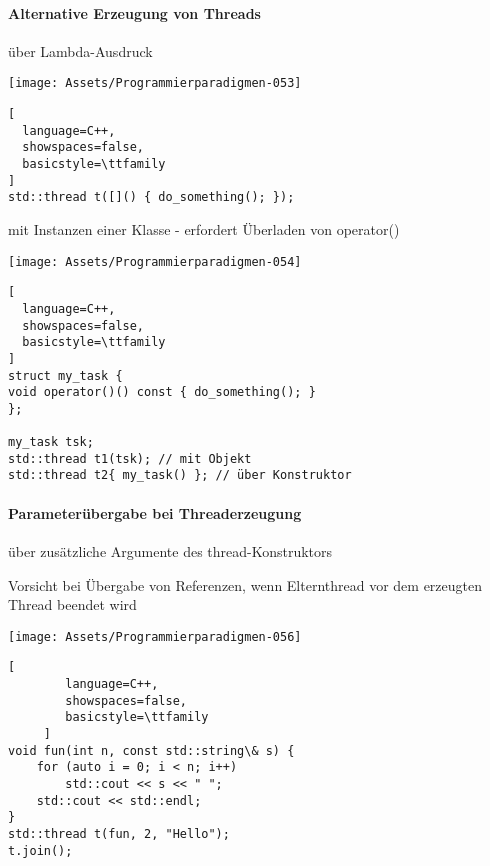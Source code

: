 \documentclass[10pt]{article}
\begin{document}
\paragraph{Alternative Erzeugung von Threads}
\color{orange} über Lambda-Ausdruck \color{black}
\begin{center}
  \texttt{[image: Assets/Programmierparadigmen-053]}
\end{center}\begin{lstlisting}[
  language=C++,
  showspaces=false,
  basicstyle=\ttfamily
]
std::thread t([]() { do_something(); });
\end{lstlisting}

\color{orange} mit Instanzen einer Klasse \color{black} - erfordert Überladen von operator()
\begin{center}
  \texttt{[image: Assets/Programmierparadigmen-054]}
\end{center}\begin{lstlisting}[
  language=C++,
  showspaces=false,
  basicstyle=\ttfamily
]
struct my_task {
void operator()() const { do_something(); }
};

my_task tsk;
std::thread t1(tsk); // mit Objekt
std::thread t2{ my_task() }; // über Konstruktor
\end{lstlisting}

\paragraph{Parameterübergabe bei Threaderzeugung}
\begin{itemize*}
  \item über zusätzliche Argumente des thread-Konstruktors
  \item Vorsicht bei Übergabe von Referenzen, wenn Elternthread vor dem erzeugten Thread beendet wird
\end{itemize*}
\begin{center}
  \texttt{[image: Assets/Programmierparadigmen-056]}
\end{center}
\begin{lstlisting}[
        language=C++,
        showspaces=false,
        basicstyle=\ttfamily
     ]
void fun(int n, const std::string\& s) {
    for (auto i = 0; i < n; i++)
        std::cout << s << " ";
    std::cout << std::endl;
}
std::thread t(fun, 2, "Hello");
t.join();
\end{lstlisting}
\end{document}
